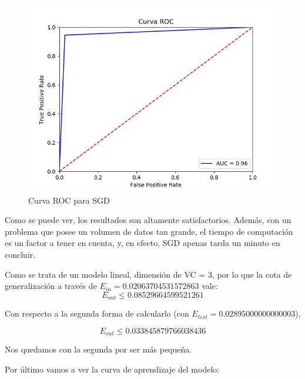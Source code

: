 \begin{figure}[H] %
	\centering
	\includegraphics[scale=0.6]{ROC-SGD.png}  %
	\caption{Curva ROC para SGD} 
	\label{fig:roc-sgd}
\end{figure}

Como se puede ver, los resultados son altamente satisfactorios. Además, con un problema que posee un volumen de datos tan grande, el tiempo de computación es un factor a tener en cuenta, y, en efecto, SGD apenas tarda un minuto en concluir. 

Como se trata de un modelo lineal, dimensión de VC = 3, por lo que la cota de generalización a través de $E_{in} = 0.02063704531572863$ vale:
$$E_{out} \leq 0.08529664599521261$$

Con respecto a la segunda forma de calcularlo (con $E_{test}=0.02895000000000003$),

$$E_{out} \leq 0.033845879766038436$$

Nos quedamos con la segunda por ser más pequeña.

Por último vamos a ver la curva de aprendizaje del modelo:

